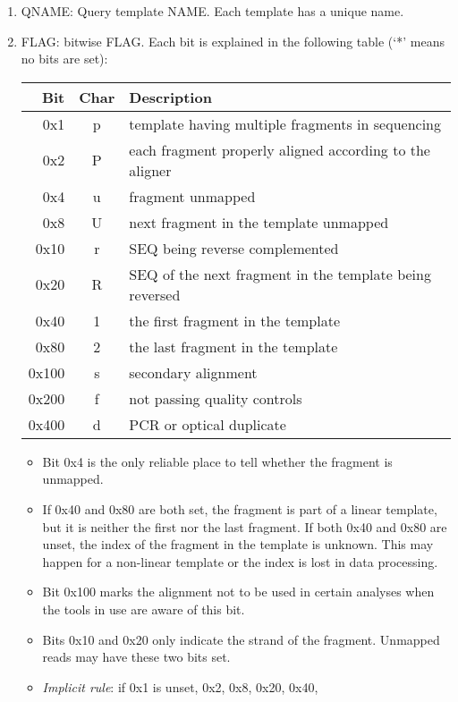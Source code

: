 \documentclass[10pt]{article}
\begin{document}
\begin{enumerate}
\item {\sf QNAME}: Query template NAME. Each template has a unique name.
\item {\sf FLAG}: bitwise FLAG. Each bit is explained in the following
  table (`*' means no bits are set):
  \begin{center}\small
  \begin{tabular}{rcl}
  \hline
  Bit & Char & Description\\
  \hline
  0x1 & p & template having multiple fragments in sequencing \\
  0x2 & P & each fragment properly aligned according to the aligner \\
  0x4 & u & fragment unmapped \\
  0x8 & U & next fragment in the template unmapped \\
  0x10 & r & {\sf SEQ} being reverse complemented \\
  0x20 & R & {\sf SEQ} of the next fragment in the template being reversed \\
  0x40 & 1 & the first fragment in the template \\
  0x80 & 2 & the last fragment in the template \\
  0x100 & s & secondary alignment\\
  0x200 & f & not passing quality controls \\
  0x400 & d & PCR or optical duplicate \\
  \hline
  \end{tabular}
  \end{center}
  \begin{itemize}
  \item Bit 0x4 is the only reliable place to tell whether the fragment is unmapped.
  \item If 0x40 and 0x80 are both set, the fragment is part of a linear
    template, but it is neither the first nor the last fragment. If both
    0x40 and 0x80 are unset, the index of the fragment in the template
    is unknown. This may happen for a non-linear template or the index
    is lost in data processing.
  \item Bit 0x100 marks the alignment not to be used in certain analyses
    when the tools in use are aware of this bit.
  \item Bits 0x10 and 0x20 only indicate the strand of the
    fragment. Unmapped reads may have these two bits set.
  \item \emph{Implicit rule}: if 0x1 is unset, 0x2, 0x8, 0x20, 0x40,

\end{itemize}
\end{enumerate}
\end{document}
